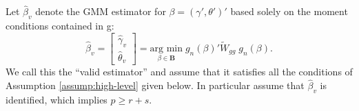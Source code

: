 \begin{assump}
  Let $\widehat{\beta}_v$ denote the GMM estimator for $\beta = \left(\gamma', \theta' \right)'$ based solely on the moment conditions contained in g:
\begin{equation}
  \widehat{\beta}_v =\left[\begin{array}{c}\widehat{\gamma}_{v} \\  \widehat{\theta}_{v} \end{array} \right] =\underset{\beta \in \mathbf{B}}{\mbox{arg min}}\; g_n(\beta)' \widetilde{W}_{gg} \; g_n(\beta).
\end{equation}
We call this the ``valid estimator'' and assume that it satisfies all the conditions of Assumption \ref{assump:high-level} given below.
In particular assume that $\widehat{\beta}_v$ is identified, which implies $p \geq r+s$.
\end{assump}

